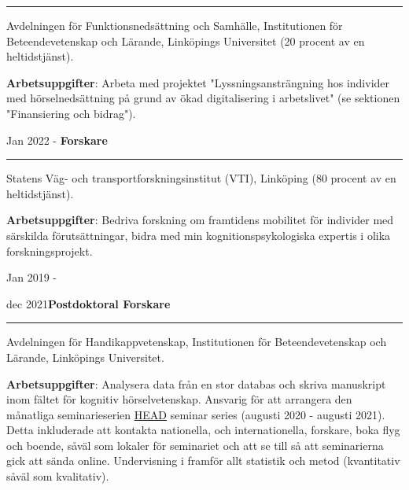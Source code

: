 \documentclass[]{article}
\begin{document}
\hrule
\begin{changemargin}{2.3cm}{2.4cm}

Avdelningen för Funktionsnedsättning och Samhälle, Institutionen för Beteendevetenskap och Lärande, Linköpings Universitet (20 procent av en heltidstjänst). 

\textbf{Arbetsuppgifter}: Arbeta med projektet "Lyssningsansträngning hos individer med hörselnedsättning på grund av ökad digitalisering i arbetslivet" (se sektionen "Finansiering och bidrag").

\end{changemargin}

Jan 2022 - \hspace{0.50cm}\textbf{Forskare}\vspace{1mm}

\hrule
\begin{changemargin}{2.3cm}{2.4cm}

Statens Väg- och transportforskningsinstitut (VTI), Linköping (80 procent av en heltidstjänst).

\textbf{Arbetsuppgifter}: Bedriva forskning om framtidens mobilitet för individer med särskilda förutsättningar, bidra med min kognitionspsykologiska expertis i olika forskningsprojekt.

\end{changemargin}

Jan 2019 -

dec 2021\hspace{0.75cm}\textbf{Postdoktoral Forskare}\vspace{1mm}

\hrule
\begin{changemargin}{2.3cm}{2.4cm}

Avdelningen för Handikappvetenskap, Institutionen för Beteendevetenskap och Lärande, Linköpings Universitet.

\textbf{Arbetsuppgifter}: Analysera data från en stor databas och skriva manuskript inom fältet för kognitiv hörselvetenskap. Ansvarig för att arrangera den månatliga seminarieserien \href{https://liu.se/linnecentrum-head/en}{HEAD} seminar series (augusti 2020 - augusti 2021). Detta inkluderade att kontakta nationella, och internationella, forskare, boka flyg och boende, såväl som lokaler för seminariet och att se till så att seminarierna gick att sända online. Undervisning i framför allt statistik och metod (kvantitativ såväl som kvalitativ).

\end{changemargin}
\end{document}

